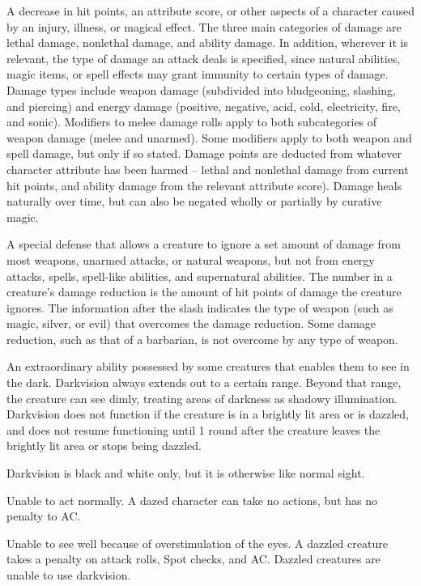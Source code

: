  A decrease in hit points, an attribute score, or other aspects 
of a character caused by an injury, illness, or magical effect. The 
three main categories of damage are lethal damage, nonlethal 
damage, and ability damage. In addition, wherever it is relevant, the 
type of damage an attack deals is specified, since natural abilities, 
magic items, or spell effects may grant immunity to certain types of 
damage. Damage types include weapon damage (subdivided into 
bludgeoning, slashing, and piercing) and energy damage (positive, 
negative, acid, cold, electricity, fire, and sonic). Modifiers to melee 
damage rolls apply to both subcategories of weapon damage (melee 
and unarmed). Some modifiers apply to both weapon and spell 
damage, but only if so stated. Damage points are deducted from 
whatever character attribute has been harmed -- lethal and 
nonlethal damage from current hit points, and ability damage from 
the relevant attribute score). Damage heals naturally over time, but can 
also be negated wholly or partially by curative magic. 

 A special defense that allows a creature 
to ignore a set amount of damage from most weapons, unarmed 
attacks, or natural weapons, but not from energy attacks, spells, 
spell-like abilities, and supernatural abilities. The number in a 
creature's damage reduction is the amount of hit points of damage 
the creature ignores. The information after the slash indicates the 
type of weapon (such as magic, silver, or evil) that overcomes the 
damage reduction. Some damage reduction, such as that of a 
barbarian, is not overcome by any type of weapon. 

 An extraordinary ability possessed by some creatures 
that enables them to see in the dark. Darkvision always extends out to a certain range. Beyond that range, the creature can see dimly, treating areas of darkness as shadowy illumination. Darkvision does not function if the creature is in a brightly lit area or is dazzled, and does not resume functioning until 1 round after the creature leaves the brightly lit area or stops being dazzled.
\par Darkvision is black and white only, but it is otherwise like normal sight. 

 Unable to act normally. A dazed character can take no 
actions, but has no penalty to AC. 

 Unable to see well because of overstimulation of the 
eyes. A dazzled creature takes a  penalty on attack rolls, Spot 
checks, and AC. Dazzled creatures are unable to use darkvision.

